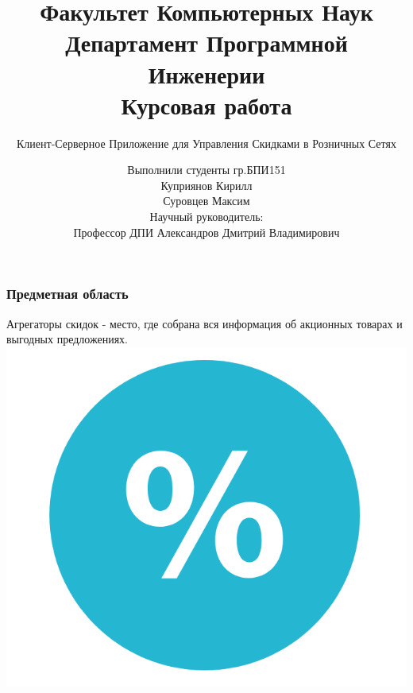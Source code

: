 \documentclass{beamer}
\title[Заголовок]{\footnotesize Факультет Компьютерных Наук\\Департамент
Программной Инженерии\\Курсовая работа}
\subtitle{Клиент-Серверное Приложение для Управления Скидками в Розничных Сетях}
\author[Куприянов К.И.,\smallskip Суровцев М.А.]{\scriptsize Выполнили студенты
гр.БПИ151\\Куприянов Кирилл\\Суровцев Максим\\Научный руководитель:\\Профессор
ДПИ Александров Дмитрий Владимирович}
\institute[Высшая школа экономики]{}
\date{\the\year}
\begin{document}
\frame[plain]{
    \maketitle
}



\begin{frame}
\frametitle{Предметная область}
	\begin{multicols}{2}
        Агрегаторы скидок - место, где собрана вся информация об акционных товарах и выгодных предложениях.
		\columnbreak
		\medskip
		\includegraphics[width=\columnwidth]{skidka.png}
	\end{multicols}
\end{frame}
\end{document}
